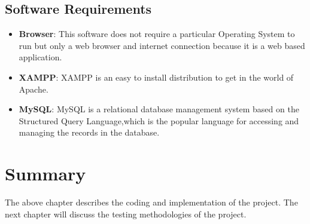 \subsection {Software Requirements}
\begin{itemize}
\item \textbf {Browser}: This software does not require a particular Operating System to run but
only a web browser and internet connection because it is a web based application.

\item \textbf {XAMPP}: XAMPP is an easy to install distribution to get in the world of Apache.

\item \textbf {MySQL}: MySQL is a relational database management system based on the Structured Query Language,which is the popular language for accessing and managing the records in the database.
\end{itemize}

\section {Summary}
The above chapter describes the coding and implementation of the project. The next chapter
will discuss the testing methodologies of the project.




